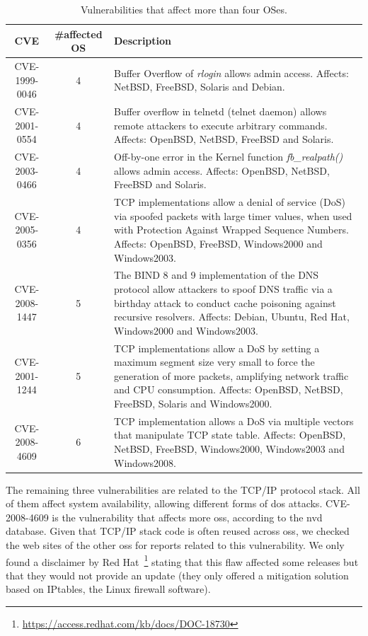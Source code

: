 \begin{table}[!ht]
\begin{center}
{\scriptsize
\begin{tabular}{|c||c| p{} | }\hline
\textbf{CVE} & \#affected OS  & Description  \\\hline\hline
CVE-1999-0046  &  4  & Buffer Overflow of \emph{rlogin} allows admin access. Affects: NetBSD, FreeBSD, Solaris and Debian. \\ \hline
CVE-2001-0554  &  4  & Buffer overflow in telnetd (telnet daemon) allows remote attackers to execute arbitrary commands. Affects: OpenBSD, NetBSD, FreeBSD and Solaris.  \\ \hline
CVE-2003-0466  &  4  & Off-by-one error in the Kernel function \emph{fb\_realpath()} allows admin access. Affects: OpenBSD, NetBSD, FreeBSD and Solaris.  \\ \hline
CVE-2005-0356  &  4  & TCP implementations allow a denial of service (DoS) via spoofed packets with large timer values, when used with Protection Against Wrapped Sequence Numbers. Affects: OpenBSD, FreeBSD, Windows2000 and Windows2003. \\ \hline
CVE-2008-1447  &  5  & The BIND 8 and 9 implementation of the DNS protocol allow attackers to spoof DNS traffic via a birthday attack to conduct cache poisoning against recursive resolvers. Affects: Debian, Ubuntu, Red Hat, Windows2000 and Windows2003.  \\ \hline
CVE-2001-1244  &  5  & TCP implementations allow a DoS by setting a maximum segment size very small to force the generation of more packets, amplifying network traffic and CPU consumption. Affects: OpenBSD, NetBSD, FreeBSD, Solaris and Windows2000. \\ \hline
CVE-2008-4609  &  6  & TCP implementation allows a DoS via multiple vectors that manipulate TCP state table. Affects: OpenBSD, NetBSD, FreeBSD, Windows2000, Windows2003 and Windows2008.   \\ \hline
\end{tabular}
}
\caption{Vulnerabilities that affect more than four OSes.}
\label{tab:spreaded_vulns}
\end{center}
\end{table}


The remaining three vulnerabilities are related to the TCP/IP protocol stack. 
All of them affect system availability, allowing different forms of \gls{dos} attacks. 
CVE-2008-4609 is the vulnerability that affects more \glspl{os}, according to the \gls{nvd} database. 
Given that TCP/IP stack code is often reused across \glspl{os}, we checked the web sites of the other \glspl{os} for reports related to this vulnerability. 
We only found a disclaimer by Red Hat~\footnote{\url{https://access.redhat.com/kb/docs/DOC-18730}} stating that this flaw affected some releases but that they would not provide an update (they only offered a mitigation solution based on IPtables, the Linux firewall software).

